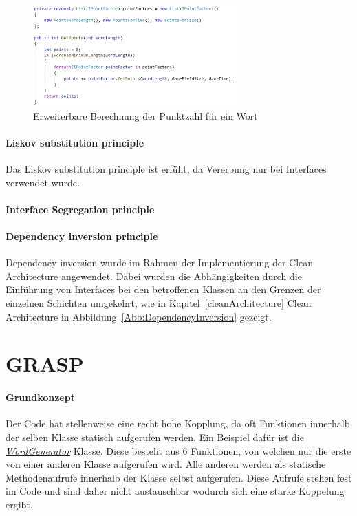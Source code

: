 \begin{figure}[!htb]
\centering
\includegraphics[width=0.7\textwidth]{Bilder/openClosedExample.PNG}
\caption{\label{Abb:openClosedExample}Erweiterbare Berechnung der Punktzahl für ein Wort}
\end{figure}

\paragraph{Liskov substitution principle}
Das Liskov substitution principle ist erfüllt, da Vererbung nur bei Interfaces verwendet wurde.

\paragraph{Interface Segregation principle}

\paragraph{Dependency inversion principle}
Dependency inversion wurde im Rahmen der Implementierung der Clean Architecture angewendet. Dabei wurden die Abhängigkeiten durch die Einführung von Interfaces bei den betroffenen Klassen an den Grenzen der einzelnen Schichten umgekehrt, wie in Kapitel~\ref{cleanArchitecture} Clean Architecture in Abbildung~\ref{Abb:DependencyInversion} gezeigt.

\section{GRASP}
\paragraph{Grundkonzept} 
Der Code hat stellenweise eine recht hohe Kopplung, da oft Funktionen innerhalb der selben Klasse statisch aufgerufen werden. Ein Beispiel dafür ist die \href{https://github.com/EinToni/Wortfinder/blob/main/Wortfinder/WordGenerator.cs}{\textit{WordGenerator}} Klasse. Diese besteht aus 6 Funktionen, von welchen nur die erste von einer anderen Klasse aufgerufen wird. Alle anderen werden als statische Methodenaufrufe innerhalb der Klasse selbst aufgerufen. Diese Aufrufe stehen fest im Code und sind daher nicht austauschbar wodurch sich eine starke Koppelung ergibt.

